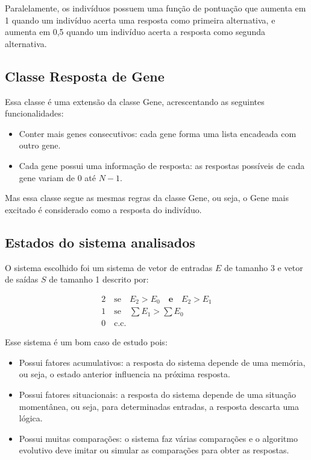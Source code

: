Paralelamente, os indivíduos possuem uma função de pontuação que aumenta em 1 quando um indivíduo acerta uma resposta como primeira alternativa, e aumenta em 0,5 quando um indivíduo acerta a resposta como segunda alternativa.

\subsection{Classe Resposta de Gene}

Essa classe é uma extensão da classe Gene, acrescentando as seguintes funcionalidades:
\begin{itemize}
    \item Conter mais genes consecutivos: cada gene forma uma lista encadeada com outro gene.
    \item Cada gene possui uma informação de resposta: as respostas possíveis de cada gene variam de 0 até $N-1$.
\end{itemize}

Mas essa classe segue as mesmas regras da classe Gene, ou seja, o Gene mais excitado é considerado como a resposta do indivíduo.

\subsection{Estados do sistema analisados}

O sistema escolhido foi um sistema de vetor de entradas $E$ de tamanho 3 e vetor de saídas $S$ de tamanho 1 descrito por:

\begin{gather*}
    2 \quad \mathrm{se} \quad E_2 > E_0 \quad \mathbf{e} \quad E_2 > E_1 \\
    1 \quad \mathrm{se} \quad \sum E_1 > \sum E_0 \\
    0 \quad \mathrm{c.c.}
\end{gather*}

Esse sistema é um bom caso de estudo pois:

\begin{itemize}
    \item Possui fatores acumulativos: a resposta do sistema depende de uma memória, ou seja, o estado anterior influencia na próxima resposta.
    \item Possui fatores situacionais: a resposta do sistema depende de uma situação momentânea, ou seja, para determinadas entradas, a resposta descarta uma lógica.
    \item Possui muitas comparações: o sistema faz várias comparações e o algoritmo evolutivo deve imitar ou simular as comparações para obter as respostas.
\end{itemize}

